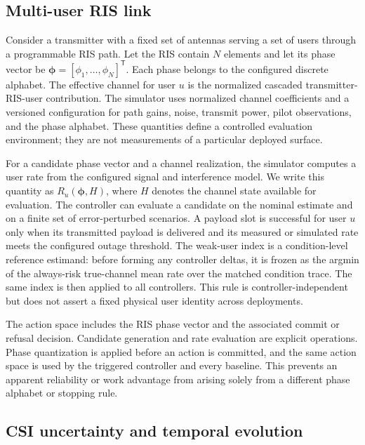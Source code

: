 \documentclass[10pt,twocolumn]{article}
\begin{document}
\subsection{Multi-user RIS link}\label{multi-user-ris-link}

Consider a transmitter with a fixed set of antennas serving a set of
users through a programmable RIS path. Let the RIS contain \(N\)
elements and let its phase vector be
\(\boldsymbol{\phi}=[\phi_1,\ldots,\phi_N]^\mathsf{T}\). Each phase
belongs to the configured discrete alphabet. The effective channel for
user \(u\) is the normalized cascaded transmitter-RIS-user contribution.
The simulator uses normalized channel coefficients and a versioned
configuration for path gains, noise, transmit power, pilot observations,
and the phase alphabet. These quantities define a controlled evaluation
environment; they are not measurements of a particular deployed surface.

For a candidate phase vector and a channel realization, the simulator
computes a user rate from the configured signal and interference model.
We write this quantity as \(R_u(\boldsymbol{\phi},H)\), where \(H\)
denotes the channel state available for evaluation. The controller can
evaluate a candidate on the nominal estimate and on a finite set of
error-perturbed scenarios. A payload slot is successful for user \(u\)
only when its transmitted payload is delivered and its measured or
simulated rate meets the configured outage threshold. The weak-user
index is a condition-level reference estimand: before forming any
controller deltas, it is frozen as the argmin of the always-risk
true-channel mean rate over the matched condition trace. The same index
is then applied to all controllers. This rule is controller-independent
but does not assert a fixed physical user identity across deployments.

The action space includes the RIS phase vector and the associated commit
or refusal decision. Candidate generation and rate evaluation are
explicit operations. Phase quantization is applied before an action is
committed, and the same action space is used by the triggered controller
and every baseline. This prevents an apparent reliability or work
advantage from arising solely from a different phase alphabet or
stopping rule.

\subsection{CSI uncertainty and temporal
evolution}\label{csi-uncertainty-and-temporal-evolution}
\end{document}
